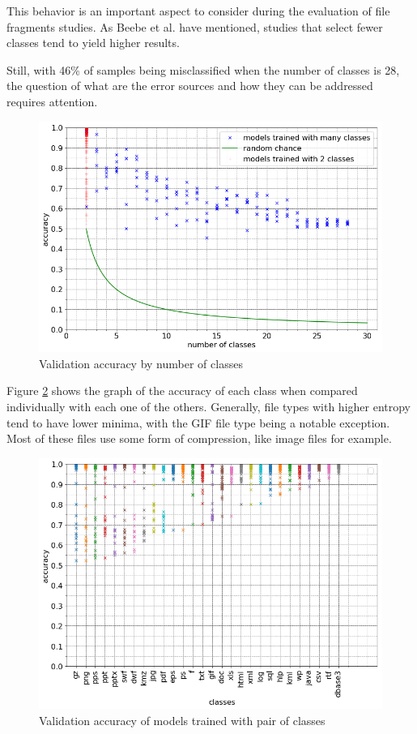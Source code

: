This behavior is an important aspect to consider during the evaluation of file fragments studies. As Beebe et al. \cite{beebe_sceadan:_2013} have mentioned, studies that select fewer classes tend to yield higher results. 

Still, with 46\% of samples being misclassified when the number of classes is 28, the question of what are the error sources and how they can be addressed requires attention.

\noindent
\begin{figure}[htb!]
\centering\includegraphics[width=1.0\textwidth]{content/nclasses.png}
\caption{\label{fig:nclasses}Validation accuracy by number of classes}%
\end{figure}

Figure \ref{fig:dual} shows the graph of the accuracy of each class when compared individually with each one of the others. Generally, file types with higher entropy tend to have lower minima, with the GIF file type being a notable exception. Most of these files use some form of compression, like image files for example. 


\noindent
\begin{figure}[htb!]
\centering\includegraphics[width=1.0\textwidth]{content/dual.png}
\caption{\label{fig:dual}Validation accuracy of models trained with pair of classes}%
\end{figure}


